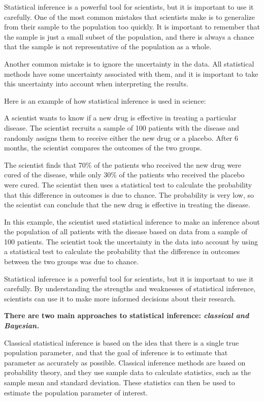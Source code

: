 \documentclass[12pt,a4paper]{article}
\theoremstyle{example}
\theoremstyle{definition}
\theoremstyle{theorem}
\begin{document}
Statistical inference is a powerful tool for scientists, but it is important to use it carefully. One of the most common mistakes that scientists make is to generalize from their sample to the population too quickly. It is important to remember that the sample is just a small subset of the population, and there is always a chance that the sample is not representative of the population as a whole.

Another common mistake is to ignore the uncertainty in the data. All statistical methods have some uncertainty associated with them, and it is important to take this uncertainty into account when interpreting the results.

Here is an example of how statistical inference is used in science:

A scientist wants to know if a new drug is effective in treating a particular disease. The scientist recruits a sample of 100 patients with the disease and randomly assigns them to receive either the new drug or a placebo. After 6 months, the scientist compares the outcomes of the two groups.

The scientist finds that 70\% of the patients who received the new drug were cured of the disease, while only 30\% of the patients who received the placebo were cured. The scientist then uses a statistical test to calculate the probability that this difference in outcomes is due to chance. The probability is very low, so the scientist can conclude that the new drug is effective in treating the disease.

In this example, the scientist used statistical inference to make an inference about the population of all patients with the disease based on data from a sample of 100 patients. The scientist took the uncertainty in the data into account by using a statistical test to calculate the probability that the difference in outcomes between the two groups was due to chance.

Statistical inference is a powerful tool for scientists, but it is important to use it carefully. By understanding the strengths and weaknesses of statistical inference, scientists can use it to make more informed decisions about their research.


\textbf{There are two main approaches to statistical inference: \textit{classical and Bayesian.}}

Classical statistical inference is based on the idea that there is a single true population parameter, and that the goal of inference is to estimate that parameter as accurately as possible. Classical inference methods are based on probability theory, and they use sample data to calculate statistics, such as the sample mean and standard deviation. These statistics can then be used to estimate the population parameter of interest.
\end{document}
